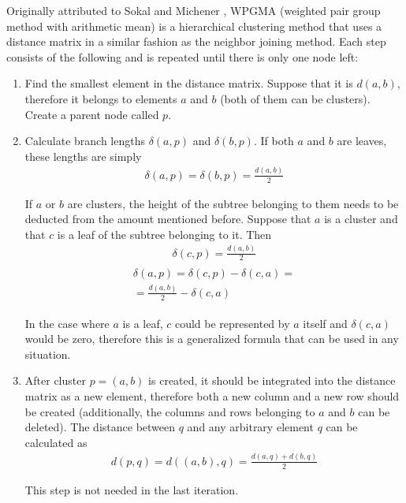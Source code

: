 \documentclass[11pt,twocolumn]{article}
\begin{document}
Originally attributed to Sokal and Michener \cite{sokal58}, WPGMA (weighted pair group method with arithmetic mean) is a hierarchical clustering method that uses a distance matrix in a similar fashion as the neighbor joining method. Each step consists of the following and is repeated until there is only one node left:

\begin{enumerate}
\item Find the smallest element in the distance matrix. Suppose that it is $d(a, b)$, therefore it belongs to elements $a$ and $b$ (both of them can be clusters). Create a parent node called $p$.

\item Calculate branch lengths $\delta(a, p)$ and $\delta(b, p)$. If both $a$ and $b$ are leaves, these lengths are simply
\begin{align}
\delta(a, p) = \delta(b, p) = \frac{d(a, b)}{2}
\end{align}

If $a$ or $b$ are clusters, the height of the subtree belonging to them needs to be deducted from the amount mentioned before. Suppose that $a$ is a cluster and that $c$ is a leaf of the subtree belonging to it. Then
\begin{align}
\delta(c, p) = \frac{d(a, b)}{2}
\end{align}
\begin{align}
\begin{split}
\delta(a, p) = \delta(c, p) - \delta(c, a) = \\
= \frac{d(a, b)}{2} - \delta(c, a)
\end{split}
\end{align}

In the case where $a$ is a leaf, $c$ could be represented by $a$ itself and $\delta(c, a)$ would be zero, therefore this is a generalized formula that can be used in any situation.

\item After cluster $p = (a, b)$ is created, it should be integrated into the distance matrix as a new element, therefore both a new column and a new row should be created (additionally, the columns and rows belonging to $a$ and $b$ can be deleted). The distance between $q$ and any arbitrary element $q$ can be calculated as
\begin{align}
d(p, q) = d((a, b), q) = \frac{d(a, q) + d(b, q)}{2}
\end{align}

This step is not needed in the last iteration.

\end{enumerate}
\end{document}
